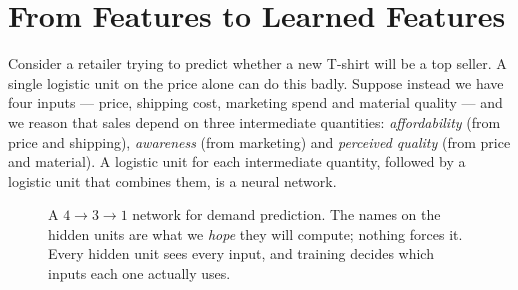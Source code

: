 \section{From Features to Learned Features}
\label{sec:learned-features}

Consider a retailer trying to predict whether a new T-shirt will be a top seller.
A single logistic unit on the price alone can do this badly. Suppose instead we
have four inputs --- price, shipping cost, marketing spend and material quality
--- and we reason that sales depend on three intermediate quantities:
\emph{affordability} (from price and shipping), \emph{awareness} (from
marketing) and \emph{perceived quality} (from price and material). A logistic
unit for each intermediate quantity, followed by a logistic unit that combines
them, is a neural network.

\begin{figure}[htbp]
  \centering
  \caption{A $4\to3\to1$ network for demand prediction. The names on the hidden
  units are what we \emph{hope} they will compute; nothing forces it. Every
  hidden unit sees every input, and training decides which inputs each one
  actually uses.}
  \label{fig:demand-net}
\end{figure}


